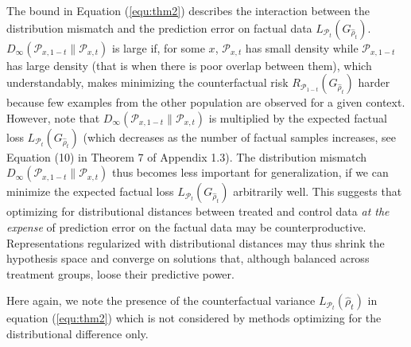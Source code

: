 \documentclass[twoside]{article}
\begin{document}
The bound in Equation (\ref{equ:thm2}) describes the interaction between the distribution mismatch and the prediction error on factual data $L_{\mathcal{P}_{t}}(G_{\hat{\rho}_t})$. $D_{\infty}(\mathcal{P}_{x,1-t}\|\mathcal{P}_{x,t})$ is large if, for some $x$, $\mathcal{P}_{x,t}$ has small density while $\mathcal{P}_{x,1-t}$ has large density (that is when there is poor overlap between them), which understandably, makes minimizing the counterfactual risk $R_{\mathcal{P}_{1-t}}(G_{\hat{\rho}_t})$ harder because few examples from the other population are observed for a given context. However, note that $D_{\infty}(\mathcal{P}_{x,1-t}\|\mathcal{P}_{x,t})$ is multiplied by the expected factual loss $L_{\mathcal{P}_{t}}(G_{\hat{\rho}_t})$ (which decreases as the number of factual samples increases, see Equation (10) in Theorem 7 of Appendix 1.3). The distribution mismatch $D_{\infty}(\mathcal{P}_{x,1-t}\|\mathcal{P}_{x,t})$ thus becomes less important for generalization, if we can minimize the expected factual loss $L_{\mathcal{P}_{t}}(G_{\hat{\rho}_t})$ arbitrarily well. This suggests that optimizing for distributional distances between treated and control data \textit{at the expense} of prediction error on the factual data may be counterproductive. Representations regularized with distributional distances may thus shrink the hypothesis space and converge on solutions that, although balanced across treatment groups, loose their predictive power.

Here again, we note the presence of the counterfactual variance $L_{\mathcal{P}_t}(\hat{\rho}_t)$ in equation (\ref{equ:thm2}) which is not considered by methods optimizing for the distributional difference only.
 
\end{document}
